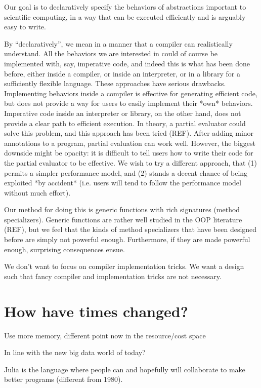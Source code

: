 
Our goal is to declaratively specify the behaviors of abstractions
important to scientific computing, in a way that can be executed
efficiently and is arguably easy to write.

By ``declaratively'', we mean in a manner that a compiler can
realistically understand. All the behaviors we are interested in
could of course be implemented with, say, imperative code, and indeed
this is what has been done before, either inside a compiler, or inside
an interpreter, or in a library for a sufficiently flexible language.
These approaches have serious drawbacks. Implementing behaviors
inside a compiler is effective for generating efficient code, but
does not provide a way for users to easily implement their *own*
behaviors. Imperative code inside an interpreter or library, on the other hand,
does not provide a clear path to efficient execution. In theory, a
partial evaluator could solve this problem, and this approach has been
tried (REF). After adding minor annotations to a program, partial evaluation
can work well. However, the biggest downside might be opacity: it is
difficult to tell users how to write their code for the partial
evaluator to be effective. We wish to try a different approach, that
(1) permits a simpler performance model, and (2) stands a decent chance
of being exploited *by accident* (i.e. users will tend to follow the performance
model without much effort).


Our method for doing this is generic functions with rich signatures
(method specializers). Generic functions are rather well studied in the
OOP literature (REF), but we feel that the kinds of method specializers
that have been designed before are simply not powerful enough.
Furthermore, if they are made powerful enough, surprising consequences
ensue.


We don't want to focus on compiler implementation tricks. We want a
design such that fancy compiler and implementation tricks are not necessary.


\section{How have times changed?}

Use more memory, different point now in the resource/cost space

In line with the new big data world of today?

Julia is the language where people can and hopefully will collaborate
to make better programs (different from 1980).

